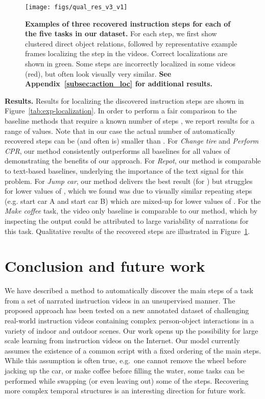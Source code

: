 \documentclass[10pt,twocolumn,letterpaper]{article}
\begin{document}
\begin{figure}
\centering\texttt{[image: figs/qual\_res\_v3\_v1]}
\vspace{-1mm}
\caption{\footnotesize {\bf Examples of three recovered instruction steps for each of the five tasks in our dataset.} For each step, we first show clustered direct object relations, followed by representative example frames localizing the step in the videos. Correct localizations are shown in green. Some steps are incorrectly localized in some videos (red), but often look visually very similar.  
{\bf See Appendix~\ref{subsec:action_loc} for additional results.}
}
\label{fig:qualitative_results} 
\end{figure}


\textbf{Results.} 
Results for localizing the discovered instruction steps are shown
in Figure~\ref{tab:exp-localization}. 
In order to perform a fair comparison to the baseline methods that require a known number of steps , we report results for a range of  values. Note that in our case the actual number of automatically recovered steps can be (and often is) smaller than .
For {\em Change tire} and {\em Perform CPR}, our method consistently outperforms all baselines for all values of  demonstrating the benefits of our approach. 
For {\em Repot}, our method is comparable to text-based baselines, underlying the importance of the text signal for this problem.
For {\em Jump car}, our method delivers the best result (for ) but struggles for lower values of , which we found was due to visually similar repeating steps (e.g. start car A and start car B) which are mixed-up for lower values of .
For the {\em Make coffee} task, the video only baseline is comparable to our method, which by inspecting the output could be attributed to large variability of narrations for this task. 
Qualitative results of the recovered steps are illustrated in Figure~\ref{fig:qualitative_results}.




\section{Conclusion and future work}
We have described a method to automatically discover the main steps of a task from a set of narrated instruction videos in an unsupervised manner.
The proposed approach has been tested on a new annotated dataset of challenging real-world instruction videos containing complex person-object interactions in a variety of indoor and outdoor scenes. Our work opens up the possibility for large scale learning from instruction videos on the Internet.
Our model currently assumes the existence of a common script with a fixed ordering of the main steps.
While this assumption is often true, e.g.~one cannot remove the wheel before jacking up the car, or make coffee before filling the water, some tasks can be performed while swapping (or even leaving out) some of the steps. Recovering more complex temporal structures is an interesting direction for future work. 
\end{document}
